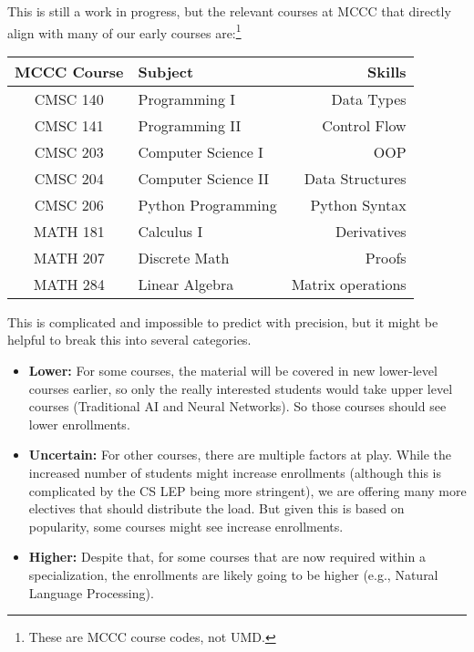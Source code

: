 
This is still a work in progress, but the relevant courses at MCCC that directly align with many of our early courses are:\footnote{These are MCCC course codes, not UMD.}

\begin{center}
\begin{tabular}{clr}
\toprule
MCCC Course & Subject & Skills \\
\midrule
CMSC 140 & Programming I & Data Types \\
CMSC 141 & Programming II & Control Flow \\
CMSC 203 & Computer Science I & OOP \\
CMSC 204 & Computer Science II & Data Structures \\
CMSC 206 & Python Programming & Python Syntax \\
MATH 181 & Calculus I & Derivatives \\
MATH 207 & Discrete Math & Proofs \\
MATH 284 & Linear Algebra & Matrix operations \\
\bottomrule
\end{tabular}
\end{center}


This is complicated and impossible to predict with precision, but it might be helpful to break this into several categories.

\begin{itemize}
    \item {\bf Lower:} For some courses, the material will be covered in new lower-level courses earlier, so only the really interested students would take upper level \ai{} courses (Traditional AI and Neural Networks).  So those courses should see lower enrollments.
    \item {\bf Uncertain:} For other courses, there are multiple factors at play.  While the increased number of students might increase enrollments (although this is complicated by the CS LEP being more stringent), we are offering many more electives that should distribute the load.  But given this is based on popularity, some courses might see increase enrollments.
    \item {\bf Higher:} Despite that, for some courses that are now required within a specialization, the enrollments are likely going to be higher (e.g., Natural Language Processing).
\end{itemize}

